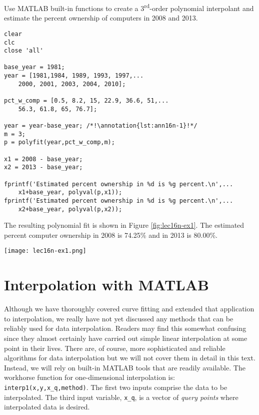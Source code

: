 \vspace{0.15cm}

\noindent Use MATLAB built-in functions to create a 3\textsuperscript{rd}-order polynomial interpolant and estimate the percent ownership of computers in 2008 and 2013. 
\begin{lstlisting}[style=myMatlab,name=lec16n-ex1]
clear
clc
close 'all'

base_year = 1981;
year = [1981,1984, 1989, 1993, 1997,...
    2000, 2001, 2003, 2004, 2010];

pct_w_comp = [0.5, 8.2, 15, 22.9, 36.6, 51,...
    56.3, 61.8, 65, 76.7];

year = year-base_year; /*!\annotation{lst:ann16n-1}!*/
m = 3;
p = polyfit(year,pct_w_comp,m);

x1 = 2008 - base_year; 
x2 = 2013 - base_year;

fprintf('Estimated percent ownership in %d is %g percent.\n',...
    x1+base_year, polyval(p,x1));
fprintf('Estimated percent ownership in %d is %g percent.\n',...
    x2+base_year, polyval(p,x2));

\end{lstlisting}
The resulting polynomial fit is shown in Figure \ref{fig:lec16n-ex1}.  The estimated percent computer ownership in 2008 is 74.25\% and in 2013 is 80.00\%.
\begin{marginfigure}
\texttt{[image: lec16n-ex1.png]}
\caption{A 3\textsuperscript{rd}-order polynomial fit using \lstinline[style=myMatlab]{polyval()} and \lstinline[style=myMatlab]{polyfit()}.}
\label{fig:lec16n-ex1}
\end{marginfigure}

\section{Interpolation with MATLAB}
Although we have thoroughly covered curve fitting and extended that application to interpolation, we really have not yet discussed any methods that can be reliably used for data interpolation.  Readers may find this somewhat confusing since they almost certainly have carried out simple linear interpolation at some point in their lives.  There are, of course, more sophisticated and reliable algorithms for data interpolation but we will not cover them in detail in this text.  Instead, we will rely on built-in MATLAB tools that are readily available.  The workhorse function for one-dimensional interpolation is: \lstinline[style=myMatlab]{interp1(x,y,x_q,method)}.  The first two inputs comprise the data to be interpolated.  The third input variable, \lstinline[style=myMatlab]{x_q}, is a vector of \emph{query points} where interpolated data is desired.  

